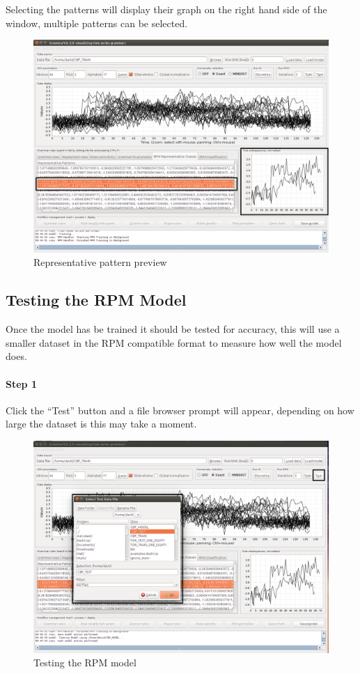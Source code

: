 \documentclass[letterpaper, 12pt]{article}
\begin{document}
\newpage
Selecting the patterns will display their graph on the right hand side of the window, multiple patterns can be selected.

\begin{figure}[H]
  \includegraphics[width=\textwidth]{TSAT-training-step-6}
  \caption{Representative pattern preview}
  \label{fig:TSAT-training-step-6}
\end{figure}

\newpage
\subsection{Testing the RPM Model}
Once the model has be trained it should be tested for accuracy, this will use a smaller dataset in the RPM compatible format to measure how well the model does. 

\paragraph{Step 1}
Click the ``Test'' button and a file browser prompt will appear, depending on how large the dataset is this may take a moment. 

\begin{figure}[H]
  \includegraphics[width=\textwidth]{TSAT-testing-step-1}
  \caption{Testing the RPM model}
  \label{fig:TSAT-testing-step-1}
\end{figure}
\end{document}
